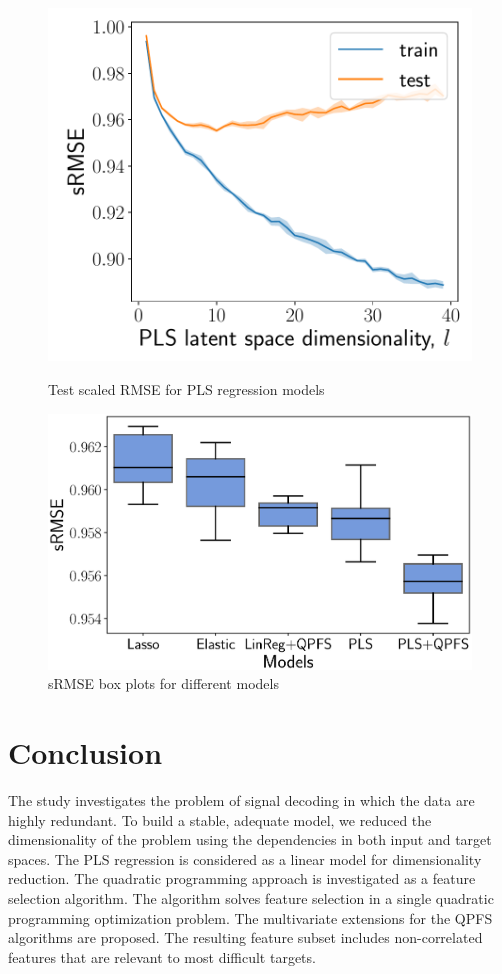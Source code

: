 \documentclass[preprint,authoryear,12pt]{elsarticle}
\theoremstyle{definition}
\begin{document}
\begin{figure}[h]
	\begin{minipage}{.41\linewidth}
		\centering
		\includegraphics[width=1.\linewidth]{pls_vs_k}
		\caption{Test scaled RMSE for PLS regression models}
		\label{fig:pls_vs_k}
	\end{minipage}%
	\begin{minipage}{.57\linewidth}
		\centering
		\includegraphics[width=1.\linewidth]{models2}
		\caption{sRMSE box plots for different models}
		\label{fig:models}
	\end{minipage}
\end{figure}

\section{Conclusion}
The study investigates the problem of signal decoding in which the data are highly redundant.
To build a stable, adequate model, we reduced the dimensionality of the problem using the dependencies in both input and target spaces.
The PLS regression is considered as a linear model for dimensionality reduction.
The quadratic programming approach is investigated as a feature selection algorithm.
The algorithm solves feature selection in a single quadratic programming optimization problem.
The multivariate extensions for the QPFS algorithms are proposed.
The resulting feature subset includes non-correlated features that are relevant to most difficult targets.
\end{document}
